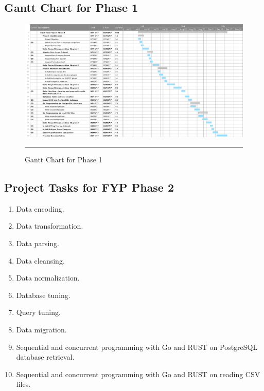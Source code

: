 \begin{landscape}
	\subsection{Gantt Chart for Phase 1}
	\begin{figure}[H]
		\centering
		\includegraphics[width=1.5\textwidth]{Figure/Gantt1.png}
		\rule{35em}{0.5pt}
		\caption[Gantt Chart for Phase 1]{Gantt Chart for Phase 1}
	\end{figure}
\end{landscape}

\subsection{Project Tasks for FYP Phase 2}

\begin{enumerate}[topsep=0pt,itemsep=-1ex,partopsep=1ex,parsep=1.5ex]
	\item Data encoding.
	\item Data transformation. 
	\item Data parsing. 
	\item Data cleansing. 
	\item Data normalization.
	\item Database tuning. 
	\item Query tuning. 
	\item Data migration.
	\item Sequential and concurrent programming with Go and RUST on PostgreSQL database retrieval.
	\item Sequential and concurrent programming with Go and RUST on reading CSV files.
	
\end{enumerate}

